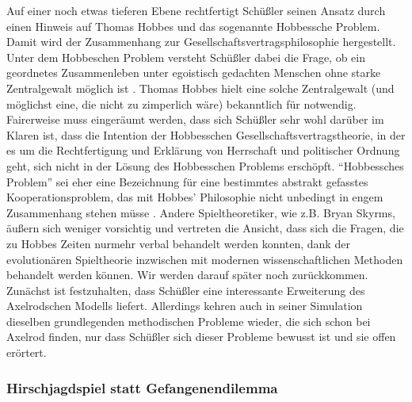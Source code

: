 \documentclass[12pt,a4paper,ngerman]{article}
\begin{document}
Auf einer noch etwas tieferen Ebene rechtfertigt Schüßler seinen
Ansatz durch einen Hinweis auf Thomas Hobbes und das sogenannte
Hobbessche Problem. Damit wird der Zusammenhang zur
Gesellschaftsvertragsphilosophie hergestellt. Unter dem Hobbeschen
Problem versteht Schüßler dabei die Frage, ob ein geordnetes
Zusammenleben unter egoistisch gedachten Menschen ohne starke
Zentralgewalt möglich ist \cite[S. 44/45]{schuessler:1997}. Thomas Hobbes hielt
eine solche Zentralgewalt (und möglichst eine, die nicht zu zimperlich wäre)
bekanntlich für notwendig. Fairerweise muss eingeräumt werden, dass
sich Schüßler sehr wohl darüber im Klaren ist, dass die Intention der
Hobbesschen Gesellschaftsvertragstheorie, in der es um die
Rechtfertigung und Erklärung von Herrschaft und politischer Ordnung
geht, sich nicht in der Lösung des Hobbesschen Problems
erschöpft. "`Hobbessches Problem"' sei eher eine Bezeichnung für eine
bestimmtes abstrakt gefasstes Kooperationsproblem, das mit Hobbes'
Philosophie nicht unbedingt in engem Zusammenhang stehen müsse \cite[S. 146
Anmerkung 6)]{schuessler:1997}. Andere
Spieltheoretiker, wie z.B. Bryan Skyrms, äußern sich weniger
vorsichtig und vertreten die Ansicht, dass sich die Fragen, die zu
Hobbes Zeiten nurmehr verbal behandelt werden konnten, dank der
evolutionären Spieltheorie inzwischen mit modernen wissenschaftlichen Methoden 
behandelt werden können. Wir werden darauf später
noch zurückkommen. Zunächst ist festzuhalten, dass Schüßler eine
interessante Erweiterung des Axelrodschen Modells liefert. Allerdings
kehren auch in seiner Simulation dieselben grundlegenden methodischen
Probleme wieder, die sich schon bei Axelrod finden, nur dass Schüßler
sich dieser Probleme bewusst ist und sie offen erörtert.

\subsubsection{Hirschjagdspiel statt Gefangenendilemma}
\end{document}
